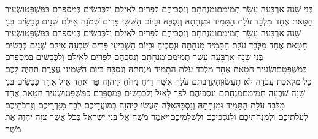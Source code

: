 \documentclass[../main/main.tex]{subfiles}
\begin{document}
\begin{multicols}{\ncols}
בְּנֵי שָׁנָה אַרְבָּעָה עָשָׂר תְּמִימִם\PreVerseSpace{}וּמִנְחָתָם וְנִסְכֵּיהֶם לַפָּרִים לָאֵילִם וְלַכְּבָשִׂים בְּמִסְפָּרָם כַּמִּשְׁפָּט\PreVerseSpace{}וּשְׂעִיר חַטָּאת אֶחָד מִלְּבַד עֹלַת הַתָּמִיד וּמִנְחָתָהּ וְנִסְכָּהּ \ClosedSection{}וּבַיּוֹם הַשִּׁשִּׁי פָּרִים שְׁמֹנָה אֵילִם שְׁנָיִם כְּבָשִׂים בְּנֵי שָׁנָה אַרְבָּעָה עָשָׂר תְּמִימִם\PreVerseSpace{}וּמִנְחָתָם וְנִסְכֵּיהֶם לַפָּרִים לָאֵילִם וְלַכְּבָשִׂים בְּמִסְפָּרָם כַּמִּשְׁפָּט\PreVerseSpace{}וּשְׂעִיר חַטָּאת אֶחָד מִלְּבַד עֹלַת הַתָּמִיד מִנְחָתָהּ וּנְסָכֶיהָ \ClosedSection{}וּבַיּוֹם הַשְּׁבִיעִי פָּרִים שִׁבְעָה אֵילִם שְׁנָיִם כְּבָשִׂים בְּנֵי שָׁנָה אַרְבָּעָה עָשָׂר תְּמִימִם\PreVerseSpace{}וּמִנְחָתָם וְנִסְכֵּהֶם לַפָּרִים לָאֵילִם וְלַכְּבָשִׂים בְּמִסְפָּרָם כְּמִשְׁפָּטָם\PreVerseSpace{}וּשְׂעִיר חַטָּאת אֶחָד מִלְּבַד עֹלַת הַתָּמִיד מִנְחָתָהּ וְנִסְכָּהּ \ClosedSection{}בַּיּוֹם הַשְּׁמִינִי עֲצֶרֶת תִּהְיֶה לָכֶם כָּל מְלֶאכֶת עֲבֹדָה לֹא תַעֲשׂוּ\PreVerseSpace{}וְהִקְרַבְתֶּם עֹלָה אִשֵּׁה רֵיחַ נִיחֹחַ לַיהוָה פַּר אֶחָד אַיִל אֶחָד כְּבָשִׂים בְּנֵי שָׁנָה שִׁבְעָה תְּמִימִם\PreVerseSpace{}מִנְחָתָם וְנִסְכֵּיהֶם לַפָּר לָאַיִל וְלַכְּבָשִׂים בְּמִסְפָּרָם כַּמִּשְׁפָּט\PreVerseSpace{}וּשְׂעִיר חַטָּאת אֶחָד מִלְּבַד עֹלַת הַתָּמִיד וּמִנְחָתָהּ וְנִסְכָּהּ\PreVerseSpace{}אֵלֶּה תַּעֲשׂוּ לַיהוָה בְּמוֹעֲדֵיכֶם לְבַד מִנִּדְרֵיכֶם וְנִדְבֹתֵיכֶם לְעֹלֹתֵיכֶם וּלְמִנְחֹתֵיכֶם וּלְנִסְכֵּיכֶם וּלְשַׁלְמֵיכֶם\PreChapterSpace{}וַיֹּאמֶר מֹשֶׁה אֶל בְּנֵי יִשְׂרָאֵל כְּכֹל אֲשֶׁר צִוָּה יַהְוֶה אֶת מֹשֶׁה\OpenSection{}\par

\end{multicols}
\end{document}
